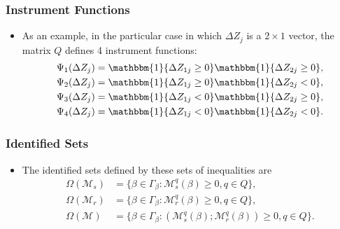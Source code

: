 \documentclass[notes=show]{beamer}
\begin{document}
\begin{frame}
\frametitle{Instrument Functions}

\begin{itemize}
	\item As an example, in the particular case in which $\Delta Z_{j}$ is a $2\times 1$ vector, the matrix $Q$ defines 4 instrument functions:
	\begin{align*}
	\Psi_{1}(\Delta Z_{j})&=\mathbbm{1}\{\Delta Z_{1j}\geq0\}\mathbbm{1}\{\Delta Z_{2j}\geq0\},\\
	\Psi_{2}(\Delta Z_{j})&=\mathbbm{1}\{\Delta Z_{1j}\geq0\}\mathbbm{1}\{\Delta Z_{2j}<0\},\\
	\Psi_{3}(\Delta Z_{j})&=\mathbbm{1}\{\Delta Z_{1j}<0\}\mathbbm{1}\{\Delta Z_{2j}\geq0\},\\
	\Psi_{4}(\Delta Z_{j})&=\mathbbm{1}\{\Delta Z_{1j}<0\}\mathbbm{1}\{\Delta Z_{2j}<0\}.
	\end{align*}
\end{itemize}
\end{frame}
\begin{frame}
\frametitle{Identified Sets}

\begin{itemize}
	\item The identified sets defined by these sets of inequalities are
	\begin{align*}
	\Omega(\mathcal{M}_{s})&=\{\beta\in\Gamma_{\beta}: \mathcal{M}^{q}_{s}(\beta)\geq 0, q\in Q\},\\
	\Omega(\mathcal{M}_{r})&=\{\beta\in\Gamma_{\beta}: \mathcal{M}^{q}_{r}(\beta)\geq 0, q\in Q\},\\
	\Omega(\mathcal{M})&=\{\beta\in\Gamma_{\beta}: (\mathcal{M}^{q}_{s}(\beta); \mathcal{M}^{q}_{r}(\beta))\geq 0,  q\in Q\}.
	\end{align*}
\end{itemize}
\end{frame}
\end{document}
